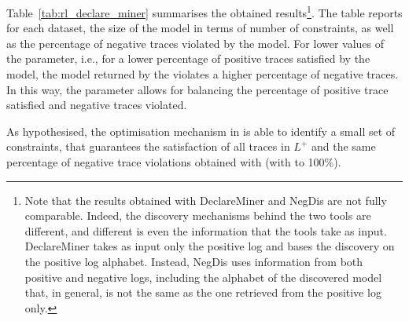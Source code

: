 Table~\ref{tab:rl_declare_miner} summarises the obtained results\footnote{Note that the results obtained with DeclareMiner and NegDis are not fully comparable. Indeed, the discovery mechanisms behind the two tools are different, and different is even the information that the tools take as input. DeclareMiner takes as input only the positive log and bases the discovery on the positive log alphabet. Instead, NegDis uses information from both positive and negative logs, including the alphabet of the discovered model that, in general, is not the same as the one retrieved from the positive log only.
}. The table reports for each dataset, the size of the model in terms of number of constraints, as well as the percentage of negative traces violated by the model. For lower values of the  parameter, i.e., for a lower percentage of positive traces satisfied by the model, the model returned by the \declareminer violates a higher percentage of negative traces. In this way, the  parameter allows for balancing the percentage of positive trace satisfied and negative traces violated. 

As hypothesised, the optimisation mechanism in \nd is able to identify a small set of constraints, that guarantees the satisfaction of all traces in $L^+$ and the same percentage of negative trace violations obtained with \declareminer (with  to 100\%).

